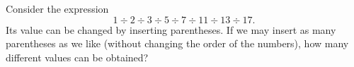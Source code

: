 Consider the expression
\[
1\div2\div3\div5\div7\div11\div13\div17.
\]
Its value can be changed by inserting parentheses. If we may insert as many parentheses as we like (without changing the order of the numbers), how many different values can be obtained?
